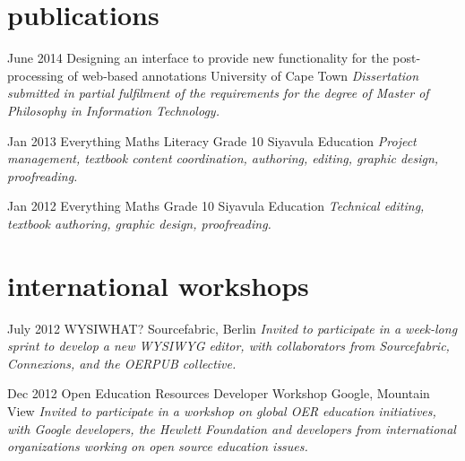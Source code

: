\documentclass[]{friggeri-cv} %
\begin{document}
\section{publications}
\begin{entrylist}
\entry
{June 2014}
{Designing an interface to provide new
functionality for the post-processing of
web-based annotations}
{University of Cape Town}
{\emph{
Dissertation submitted in partial fulfilment of the requirements
for the degree of Master of Philosophy in Information Technology.} 
 }



\entry
{Jan 2013}
{Everything Maths Literacy Grade 10}
{Siyavula Education}
{\emph{Project management, textbook content coordination, authoring, editing, graphic design, proofreading.}}

\entry
{Jan 2012}
{Everything Maths Grade 10}
{Siyavula Education}
{\emph{Technical editing, textbook authoring, graphic design, proofreading.}}

\end{entrylist}


\section{international workshops}

\begin{entrylist}
\entry
{July 2012}
{WYSIWHAT?}
{Sourcefabric, Berlin}
{\emph{Invited to participate in a week-long sprint to develop a new WYSIWYG editor, with collaborators from Sourcefabric, Connexions, and the OERPUB collective.}}

\entry
{Dec 2012}
{Open Education Resources Developer Workshop}
{Google, Mountain View}
{\emph{Invited to participate in a workshop on global OER education initiatives, with Google developers, the Hewlett Foundation and developers from international organizations working on open source education issues.}}

\end{entrylist}
\end{document}
